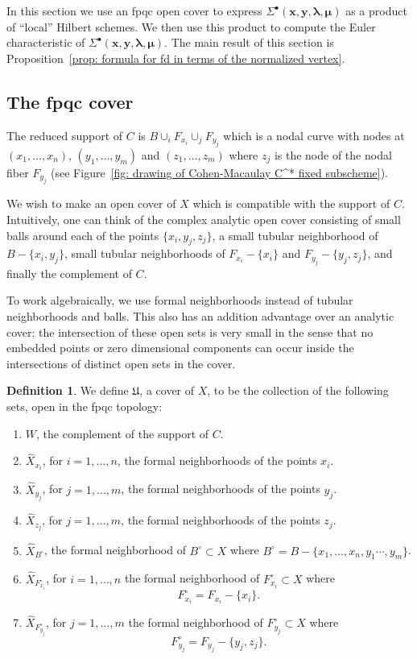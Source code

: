 \documentclass[12pt]{amsart}
\theoremstyle{definition}
\newtheorem{definition}[theorem]{Definition}
\newcommand{\boldx}{\boldsymbol{x}}
\newcommand{\boldy}{\boldsymbol{y}}
\newcommand{\boldlambda}{\boldsymbol{\lambda }}
\newcommand{\boldmu}{\boldsymbol{\mu }}
\newcommand{\Sigmaxylambdamu}{\Sigma^{\bullet }(\boldx ,\boldy ,\boldlambda ,\boldmu )}
\newcommand{\Xhat}{\widehat{X}}
\begin{document}
In this section we use an fpqc open cover to express
$\Sigmaxylambdamu$ as a product of ``local'' Hilbert schemes. We then
use this product to compute the Euler characteristic of
$\Sigmaxylambdamu$. The main result of this section is
Proposition~\ref{prop: formula for fd in terms of the normalized
vertex}.


\subsection{The fpqc cover}\label{subsec: the fpqc cover}
The reduced support of $C$ is $B\cup_{i}F_{x_{i}}\cup_{j}F_{y_{j}}$
which is a nodal curve with nodes at $(x_{1},\dotsc ,x_{n})$,
$(y_{1},\dotsc ,y_{m})$ and $(z_{1},\dotsc ,z_{m})$ where $z_{j}$ is
the node of the nodal fiber $F_{y_{j}}$ (see Figure~\ref{fig: drawing
of Cohen-Macaulay C^* fixed subscheme}).

We wish to make an open cover of $X$ which is compatible with the
support of $C$. Intuitively, one can think of the complex analytic
open cover consisting of small balls around each of the points
$\{x_{i},y_{j},z_{j} \}$, a small tubular neighborhood of
$B-\{x_{i},y_{j} \}$, small tubular neighborhoods of
$F_{x_{i}}-\{x_{i} \}$ and $F_{y_{j}}-\{y_{j},z_{j} \}$, and finally
the complement of $C$.

To work algebraically, we use formal neighborhoods instead of tubular
neighborhoods and balls. This also has an addition advantage over an
analytic cover: the intersection of these open sets is very small in
the sense that no embedded points or zero dimensional components can
occur inside the intersections of distinct open sets in the cover.

\begin{definition}\label{defn: the fpqc cover mathfrak U}
We define $\mathfrak{U}$, a cover of $X$, to be the collection of the
following sets, open in the fpqc topology:\begin{enumerate}
\item $W$, the complement of the support of $C$.
\item $\Xhat_{x_{i}}$, for $i=1,\dotsc ,n$, the formal neighborhoods
of the points $x_{i}$.
\item $\Xhat_{y_{j}}$, for $j=1,\dotsc ,m$, the formal neighborhoods
of the points $y_{j}$.
\item $\Xhat_{z_{j}}$, for $j=1,\dotsc ,m$, the formal neighborhoods
of the points $z_{j}$.
\item $\Xhat_{B^{\circ}}$, the formal neighborhood of
$B^{\circ}\subset X$ where $B^{\circ}=B-\{x_{1},\dotsc
,x_{n},y_{1}\dotsb ,y_{m} \}$. 
\item $\Xhat_{F_{x_{i}}^{\circ}}$, for $i=1,\dotsc ,n$ the formal neighborhood of
$F_{x_{i}}^{\circ}\subset X$ where 
\[
F_{x_{i}}^{\circ}=F_{x_{i}}-\{x_{i} \}.
\]
\item $\Xhat_{F_{y_{j}}^{\circ}}$, for $j=1,\dotsc ,m$ the formal neighborhood of
$F_{y_{j}}^{\circ}\subset X$ where 
\[
F_{y_{j}}^{\circ}=F_{y_{j}}-\{y_{j},z_{j} \}.
\]
\end{enumerate}
\end{definition}
\end{document}
